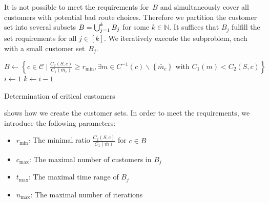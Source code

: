 It is not possible to meet the requirements for~$B$ and simultaneously cover all customers with potential bad route choices. Therefore we partition the customer set into several subsets ${B=\bigcup_{j=1}^k B_j}$ for some ${k\in\mathbb{N}}$. It suffices that $B_j$ fulfill the set requirements for all ${j\in[k]}$. We iteratively execute the subproblem, each with a small customer set~$B_j$.

\begin{algorithm}[htb]
	\SetAlgoLined
	$B\gets\left\{c\in\mathcal{C}\mid\frac{C_2(S,c)}{C_1\left(\bar{m}_c\right)}\geq r_{\min}, \exists m\in C^{-1}(c)\backslash\left\{\bar{m}_c\right\} \text{ with } C_1(m)<C_2(S,c)\right\}$\;
	$i\gets 1$\;
	$k\gets i-1$\;
	\caption{Determination of critical customers}
	\label{alg:critical_customers}
\end{algorithm}

 shows how we create the customer sets. In order to meet the requirements, we introduce the following parameters:
\begin{itemize}
	\item{$r_{\min}$:} The minimal ratio $\frac{C_2(S,c)}{C_1\left(\bar{m}\right)}$ for ${c\in B}$
	\item{$c_{\max}$:} The maximal number of customers in $B_j$
	\item{$t_{\max}$:} The maximal time range of $B_j$
	\item{$n_{\max}$:} The maximal number of iterations
\end{itemize}

